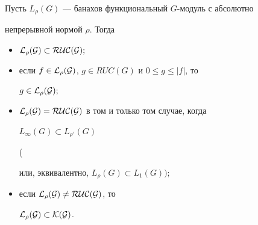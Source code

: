 \begin{thms}


Пусть $L_\rho(G)$ --- банахов функциональный $G$-модуль с абсолютно


непрерывной нормой $\rho$. Тогда


\begin{itemize}


\item[1)] $\cal L_\rho(G)\subset RUC(G);$


\item[2)] если $f\in\cal L_\rho(G)$, $g\in RUC(G)$ и $0\le g\le |f|$, то


$g\in\cal L_\rho(G);$


\item[3)] $\cal L_\rho(G)=RUC(G)$ в том и только том случае, когда


$L_\infty(G)\subset L_{\rho'}(G)$ {\em


(}или, эквивалентно, $L_\rho(G)\subset L_1(G));$


\item[4)] если $\cal L_\rho(G)\ne RUC(G)$, то


$\cal L_\rho(G)\subset\cal K(G)$.


\end{itemize}


\end{thms}





